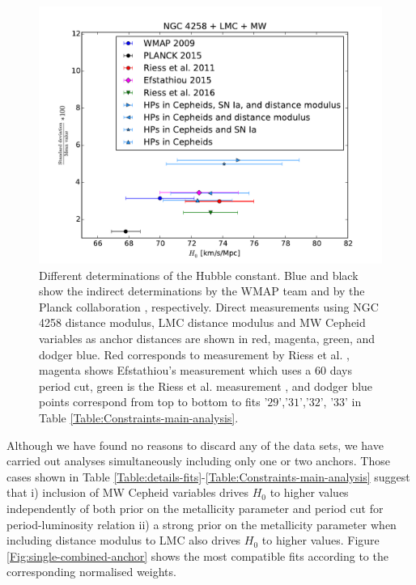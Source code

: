 \begin{figure}[hbtp]
\centering
\includegraphics[scale=.75]{figures/chapter-h0/H0_values_three_anchors.pdf}
\caption{Different determinations of the Hubble constant. Blue and black show the indirect determinations by the WMAP team \cite{Hinshaw:2012aka} and by the Planck collaboration \cite{Ade:2015xua}, respectively. Direct measurements using NGC 4258 distance modulus, LMC distance modulus and MW Cepheid variables as anchor distances are shown in red, magenta, green, and dodger blue. Red corresponds to measurement by Riess et al. \cite{Riess:2011yx}, magenta shows Efstathiou's measurement \cite{Efstathiou:2013via} which uses a $60$ days period cut, green is the Riess et al. measurement \cite{Riess:2016jrr}, and dodger blue points correspond from top to bottom to fits '$29$','$31$','$32$', '$33$' in Table \ref{Table:Constraints-main-analysis}.\label{Fig:H0-values-3-anchors}}
\end{figure}

Although we have found no reasons to discard any of the data sets, we have carried out analyses simultaneously including only one or two anchors. Those cases shown in Table \ref{Table:details-fits}-\ref{Table:Constraints-main-analysis} suggest that i) inclusion of MW Cepheid variables drives $H_0$ to higher values independently of both prior on the metallicity parameter and period cut for period-luminosity relation ii) a strong prior on the metallicity parameter when including distance modulus to LMC also drives $H_0$ to higher values. Figure \ref{Fig:single-combined-anchor} shows the most compatible fits according to the corresponding normalised weights. 
 
